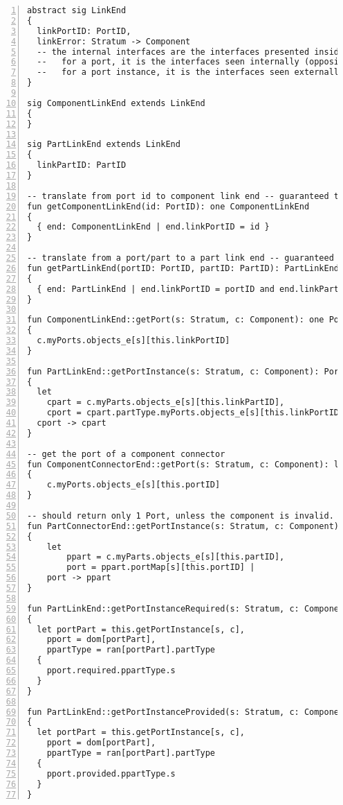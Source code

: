 \begin{lstlisting}[caption={bb\_structure.als}, numbers=left]
abstract sig LinkEnd
{
  linkPortID: PortID,
  linkError: Stratum -> Component
  -- the internal interfaces are the interfaces presented inside the component content area
  --   for a port, it is the interfaces seen internally (opposite)
  --   for a port instance, it is the interfaces seen externally (same)
}

sig ComponentLinkEnd extends LinkEnd
{
}

sig PartLinkEnd extends LinkEnd
{
  linkPartID: PartID
}

-- translate from port id to component link end -- guaranteed to be 1 per id
fun getComponentLinkEnd(id: PortID): one ComponentLinkEnd
{
  { end: ComponentLinkEnd | end.linkPortID = id }
}

-- translate from a port/part to a part link end -- guaranteed to be 1 per pair
fun getPartLinkEnd(portID: PortID, partID: PartID): PartLinkEnd
{
  { end: PartLinkEnd | end.linkPortID = portID and end.linkPartID = partID }
}

fun ComponentLinkEnd::getPort(s: Stratum, c: Component): one Port
{
  c.myPorts.objects_e[s][this.linkPortID]
}

fun PartLinkEnd::getPortInstance(s: Stratum, c: Component): Port -> Part
{
  let
    cpart = c.myParts.objects_e[s][this.linkPartID],
    cport = cpart.partType.myPorts.objects_e[s][this.linkPortID] |
  cport -> cpart
}

-- get the port of a component connector
fun ComponentConnectorEnd::getPort(s: Stratum, c: Component): lone Port
{
    c.myPorts.objects_e[s][this.portID]
}

-- should return only 1 Port, unless the component is invalid. NOTE: the component owns the part
fun PartConnectorEnd::getPortInstance(s: Stratum, c: Component): Port -> Part
{
    let
        ppart = c.myParts.objects_e[s][this.partID],
        port = ppart.portMap[s][this.portID] |
    port -> ppart
}

fun PartLinkEnd::getPortInstanceRequired(s: Stratum, c: Component): set Interface
{
  let portPart = this.getPortInstance[s, c],
    pport = dom[portPart],
    ppartType = ran[portPart].partType
  {
    pport.required.ppartType.s
  }
}

fun PartLinkEnd::getPortInstanceProvided(s: Stratum, c: Component): set Interface
{
  let portPart = this.getPortInstance[s, c],
    pport = dom[portPart],
    ppartType = ran[portPart].partType
  {
    pport.provided.ppartType.s
  }
}
\end{lstlisting}
